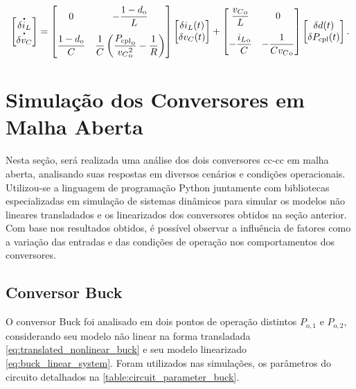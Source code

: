 \begin{equation}
  \begin{bmatrix} 
    \dt{\delta i_L} \\ \dt{\delta v_C} 
  \end{bmatrix} = 
  \begin{bmatrix} 
    \displaystyle 0 & \displaystyle -\frac{1 - d_{\mathrm{o}}}{L}  \\[12pt]\displaystyle \frac{1 - d_{\mathrm{o}}}{C} & \displaystyle \frac{1}{C}\left(\frac{{P_{\mathrm{cpl}}}_{\mathrm{o}}}{{{v_{C}}^2_{\mathrm{o}}}} - \frac{1}{R}\right) 
  \end{bmatrix} 
  \begin{bmatrix} 
    \delta i_L(t) \\ \delta v_C(t) 
  \end{bmatrix} + 
  \begin{bmatrix} 
    \displaystyle \frac{{v_C}_{\mathrm{o}}}{L} & 0 \\[12pt] 
    \displaystyle - \frac{{i_L}_{\mathrm{o}}}{C} & \displaystyle {-\frac{1}{C{v_C}_{\mathrm{o}}}} 
  \end{bmatrix}  
  \begin{bmatrix} 
    \delta d(t) \\ \delta P_{\mathrm{cpl}}(t) 
  \end{bmatrix}. \label{eq:boost_linear_system}
\end{equation}

\section{Simulação dos Conversores em Malha Aberta}

Nesta seção, será realizada uma análise dos dois conversores \acrshort{cc}-\acrshort{cc} em malha aberta, analisando suas respostas em diversos cenários e condições operacionais. Utilizou-se a linguagem de programação Python juntamente com bibliotecas especializadas em simulação de sistemas dinâmicos para simular os modelos não lineares transladados e os linearizados dos conversores obtidos na seção anterior. Com base nos resultados obtidos, é possível observar a influência de fatores como a variação das entradas e das condições de operação nos comportamentos dos conversores.

\subsection{Conversor Buck}

O conversor Buck foi analisado em dois pontos de operação distintos $P_{\mathrm{o}, 1}$ e $P_{\mathrm{o}, 2}$, considerando seu modelo não linear na forma transladada \eqref{eq:translated_nonlinear_buck} e seu modelo linearizado \eqref{eq:buck_linear_system}. Foram utilizados nas simulações, os parâmetros do circuito detalhados na \autoref{table:circuit_parameter_buck}.

